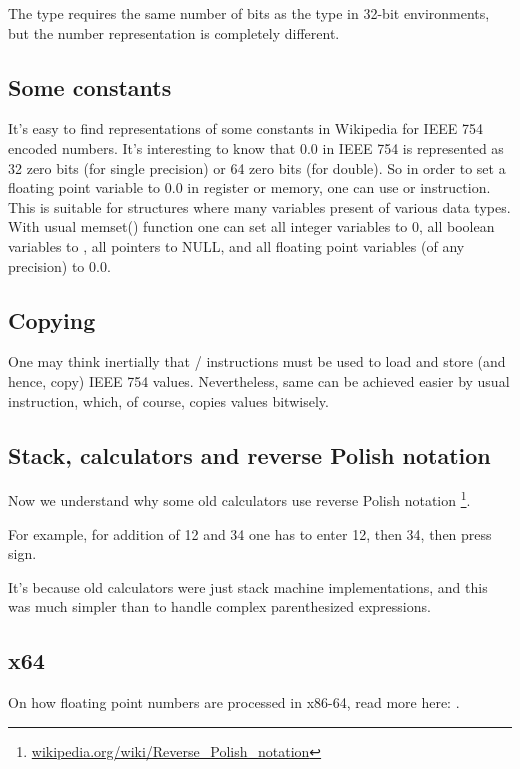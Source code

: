 The \Tfloat type requires the same number of bits as the \Tint type in 32-bit environments, 
but the number representation is completely different.





\subsection{Some constants}

It's easy to find representations of some constants in Wikipedia for IEEE 754 encoded numbers.
It's interesting to know that 0.0 in IEEE 754 is represented as 32 zero bits (for single precision) or 64 zero bits
(for double).
So in order to set a floating point variable to 0.0 in register or memory, one can use \MOV or  instruction.
This is suitable for structures where many variables present of various data types.
With usual memset() function one can set all integer variables to 0, all boolean variables to , all pointers
to NULL, and all floating point variables (of any precision) to 0.0.

\subsection{Copying}

One may think inertially that / instructions must be used to load and store (and hence, copy) IEEE 754 values.
Nevertheless, same can be achieved easier by usual  instruction, which, of course, copies values bitwisely.

\subsection{Stack, calculators and reverse Polish notation}


Now we understand why some old calculators use reverse Polish notation
\footnote{\href{http://go.yurichev.com/17354}{wikipedia.org/wiki/Reverse\_Polish\_notation}}.

For example, for addition of 12 and 34 one has to enter 12, then 34, then press  sign.

It's because old calculators were just stack machine implementations, and this was much simpler
than to handle complex parenthesized expressions.
\subsection{x64}

On how floating point numbers are processed in x86-64, read more here: .


